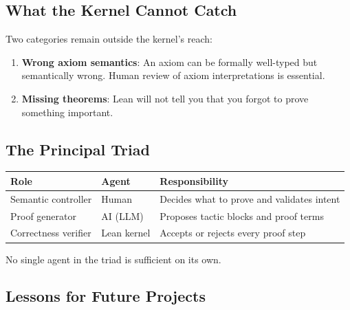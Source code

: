 \subsection{What the Kernel Cannot Catch}

Two categories remain outside the kernel's reach:

\begin{enumerate}
  \item \textbf{Wrong axiom semantics}: An axiom can be formally well-typed but
        semantically wrong. Human review of axiom interpretations is essential.
  \item \textbf{Missing theorems}: Lean will not tell you that you forgot to
        prove something important.
\end{enumerate}

\subsection{The Principal Triad}

\begin{center}
\begin{tabular}{lll}
\toprule
Role & Agent & Responsibility \\
\midrule
Semantic controller & Human & Decides what to prove and validates intent \\
Proof generator & AI (LLM) & Proposes tactic blocks and proof terms \\
Correctness verifier & Lean kernel & Accepts or rejects every proof step \\
\bottomrule
\end{tabular}
\end{center}

No single agent in the triad is sufficient on its own.

\subsection{Lessons for Future Projects}

